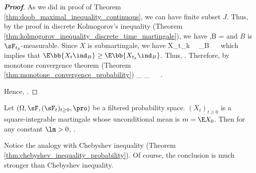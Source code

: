 \begin{proof}[\bf Proof]
As we did in proof of Theorem \ref{thm:doob_maximal_inequality_continuous}, we can have finite subset $J$. Thus, by the proof in discrete Kolmogorov's inequality (Theorem \ref{thm:kolmogorov_inequality_discrete_time_martingale}), we have
\be
\pro{} \leq {},\qquad B = 
\ee
and $B$ is $\sF_{t_k}$-measurable. Since $X$ is submartingale, we have
\be
\E{} \geq X_{t_k}  \ \ra \ \ind_B  \ \ra \ \E{} 
\ee
which implies that $\E\bb{X_t\ind_B} \geq \E\bb{X_{t_k}\ind_B}$. Thus,
\be
\pro{} \leq {} \leq {} \leq {} \leq {}.
\ee
Therefore, by monotone convergence theorem (Theorem \ref{thm:monotone_convergence_probability})
\be
\ind_{} \ua \ind_{} \ \ra \ \pro{} \ua \pro{}.
\ee

Hence,
\be
\pro{} \leq {}.%
\ee%
\end{proof}

\begin{corollary}\label{cor:kolmogorov_inequality_continuous_time_martingale}
Let $(\Omega,\sF,(\sF_t)_{t\geq 0},\pro)$ be a filtered probability space. $(X_t)_{t\geq 0}$ is a square-integrable martingale whose unconditional mean is $m = \E X_0$. Then for any constant $\lm >0$,
\be
\pro{} \leq {}.
\ee
\end{corollary}

\begin{remark}
Notice the analogy with Chebyshev inequality (Theorem \ref{thm:chebyshev_inequality_probability}). Of course, the conclusion is much stronger than Chebyshev inequality.
\end{remark}


